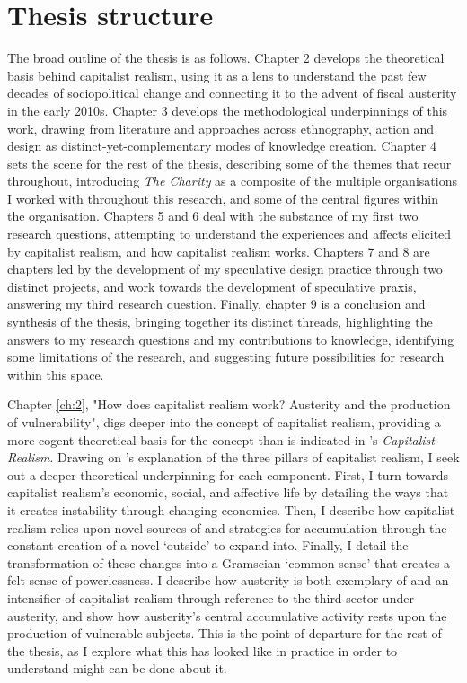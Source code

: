 \section{Thesis structure}
The broad outline of the thesis is as follows. Chapter 2 develops the theoretical basis behind capitalist realism, using it as a lens to understand the past few decades of sociopolitical change and connecting it to the advent of fiscal austerity in the early 2010s. Chapter 3 develops the methodological underpinnings of this work, drawing from literature and approaches across ethnography, action and design as distinct-yet-complementary modes of knowledge creation. Chapter 4 sets the scene for the rest of the thesis, describing some of the themes that recur throughout, introducing \textit{The Charity} as a composite of the multiple organisations I worked with throughout this research, and some of the central figures within the organisation. Chapters 5 and 6 deal with the substance of my first two research questions, attempting to understand the experiences and affects elicited by capitalist realism, and how capitalist realism works. Chapters 7 and 8 are chapters led by the development of my speculative design practice through two distinct projects, and work towards the development of speculative praxis, answering my third research question. Finally, chapter 9 is a conclusion and synthesis of the thesis, bringing together its distinct threads, highlighting the answers to my research questions and my contributions to knowledge, identifying some limitations of the research, and suggesting future possibilities for research within this space.

Chapter \ref{ch:2}, "How does capitalist realism work? Austerity and the production of vulnerability", digs deeper into the concept of capitalist realism, providing a more cogent theoretical basis for the concept than is indicated in \citet{fisher_capitalist_2009}'s \textit{Capitalist Realism}. Drawing on \cite{shonkwiler_reading_2014}'s explanation of the three pillars of capitalist realism, I seek out a deeper theoretical underpinning for each component. First, I turn towards capitalist realism's economic, social, and affective life by detailing the ways that it creates instability through changing economics. Then, I describe how capitalist realism relies upon novel sources of and strategies for accumulation through the constant creation of a novel `outside' to expand into. Finally, I detail the transformation of these changes into a Gramscian `common sense' that creates a felt sense of powerlessness. I describe how austerity is both exemplary of and an intensifier of capitalist realism through reference to the third sector under austerity, and show how austerity's central accumulative activity rests upon the production of vulnerable subjects. This is the point of departure for the rest of the thesis, as I explore what this has looked like in practice in order to understand might can be done about it. 

